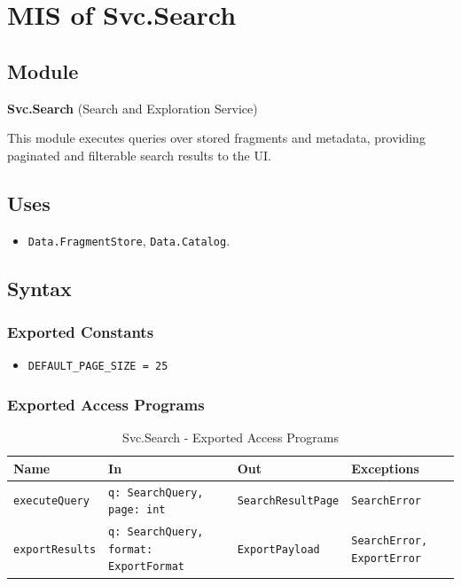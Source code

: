 \documentclass[12pt, titlepage]{article}
\begin{document}
\section{MIS of Svc.Search} \label{Svc.Search}

\subsection{Module}
\textbf{Svc.Search} \; (Search and Exploration Service)

This module executes queries over stored fragments and metadata, providing paginated and filterable search results to the UI.

\subsection{Uses}
\begin{itemize}
    \item \texttt{Data.FragmentStore}, \texttt{Data.Catalog}.
\end{itemize}

\subsection{Syntax}

\subsubsection{Exported Constants}
\begin{itemize}
    \item \texttt{DEFAULT\_PAGE\_SIZE = 25}
\end{itemize}

\subsubsection{Exported Access Programs}

\begin{table}[H]
\centering
\small
\caption{Svc.Search - Exported Access Programs}
\begin{tabular}{p{3.5cm} p{4cm} p{3.2cm} p{4.3cm}}
\toprule
\textbf{Name} & \textbf{In} & \textbf{Out} & \textbf{Exceptions} \\
\midrule
\texttt{executeQuery} & \texttt{q: SearchQuery, page: int} & \texttt{SearchResultPage} & \texttt{SearchError} \\
\texttt{exportResults} & \texttt{q: SearchQuery, format: ExportFormat} & \texttt{ExportPayload} & \texttt{SearchError, ExportError} \\
\bottomrule
\end{tabular}
\end{table}
\end{document}
